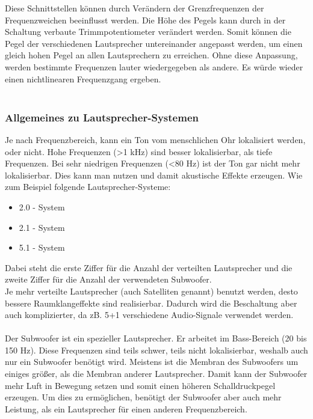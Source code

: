 
Diese Schnittstellen können durch Verändern der Grenzfrequenzen der Frequenzweichen beeinflusst werden.
Die Höhe des Pegels kann durch in der Schaltung verbaute Trimmpotentiometer verändert werden.
Somit können die Pegel der verschiedenen Lautsprecher untereinander angepasst werden, um einen gleich hohen Pegel an allen Lautsprechern zu erreichen.
Ohne diese Anpassung, werden bestimmte Frequenzen lauter wiedergegeben als andere.
Es würde wieder einen nichtlinearen Frequenzgang ergeben.\\ \\

\subsubsection*{Allgemeines zu Lautsprecher-Systemen}
Je nach Frequenzbereich, kann ein Ton vom menschlichen Ohr lokalisiert \mbox{werden}, oder nicht.
Hohe Frequenzen (>1 kHz) sind besser lokalisierbar, als tiefe Frequenzen.
Bei sehr niedrigen Frequenzen (<80 Hz) ist der Ton gar nicht mehr lokalisierbar. %
Dies kann man nutzen und damit akustische Effekte erzeugen.
Wie zum Beispiel folgende Lautsprecher-Systeme:
\begin{itemize}
	\item 2.0 - System
	\item 2.1 - System
	\item 5.1 - System
\end{itemize}
Dabei steht die erste Ziffer für die Anzahl der verteilten Lautsprecher und die zweite Ziffer für die Anzahl der verwendeten Subwoofer.
\\
Je mehr verteilte Lautsprecher (auch Satelliten genannt) benutzt werden, desto bessere Raumklangeffekte sind realisierbar.
Dadurch wird die Beschaltung aber auch komplizierter, da zB. 5+1 verschiedene Audio-Signale verwendet werden.
\\ \\
Der Subwoofer ist ein spezieller Lautsprecher.
Er arbeitet im Bass-Bereich (20 bis 150 Hz).
Diese Frequenzen sind teils schwer, teils nicht lokalisierbar, weshalb auch nur ein Subwoofer benötigt wird.
Meistens ist die Membran des Subwoofers um einiges größer, als die Membran anderer Lautsprecher.
Damit kann der Subwoofer mehr Luft in Bewegung setzen und somit einen höheren Schalldruckpegel erzeugen.
Um dies zu ermöglichen, benötigt der Subwoofer aber auch mehr Leistung, als ein Lautsprecher für einen anderen Frequenzbereich.
\\ \\

